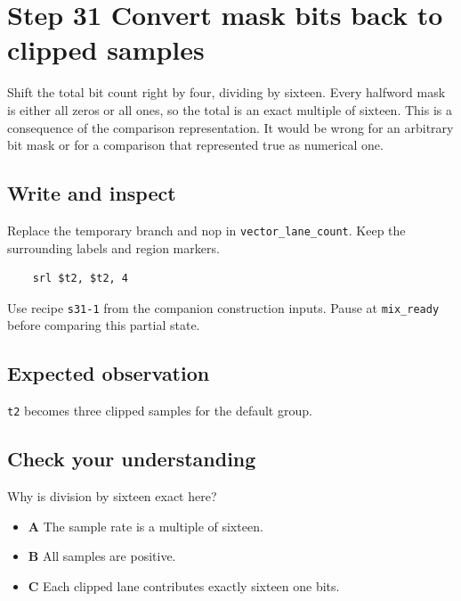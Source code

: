 \section{Step 31 Convert mask bits back to clipped samples}\label{pcm-s31}

Shift the total bit count right by four, dividing by sixteen. Every halfword mask is either all zeros or all ones, so the total is an exact multiple of sixteen. This is a consequence of the comparison representation. It would be wrong for an arbitrary bit mask or for a comparison that represented true as numerical one.

\subsection{Write and inspect}
Replace the temporary branch and nop in \texttt{vector\_lane\_count}. Keep the surrounding labels and region markers.

\begin{verbatim}
    srl $t2, $t2, 4
\end{verbatim}
Use recipe \texttt{s31-1} from the companion construction inputs. Pause at \texttt{mix\_ready} before comparing this partial state.

\subsection{Expected observation}
\texttt{t2} becomes three clipped samples for the default group.

\subsection{Check your understanding}
Why is division by sixteen exact here?

\begin{itemize}
\item \textbf{A} The sample rate is a multiple of sixteen.
\item \textbf{B} All samples are positive.
\item \textbf{C} Each clipped lane contributes exactly sixteen one bits.
\end{itemize}
